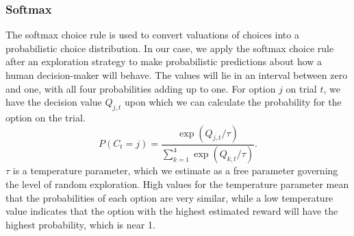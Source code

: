 \subsubsection{Softmax}
The softmax choice rule is used to convert valuations of choices into a probabilistic choice distribution. In our case, we apply the softmax choice rule after an exploration strategy to make probabilistic predictions about how a human decision-maker will behave. The values will lie in an interval between zero and one, with all four probabilities adding up to one. %
For option $j$ on trial $t$, we have the decision value $Q_{j,t}$ upon which we can calculate the probability for the option on the trial. 
\begin{equation}
P(C_{t}=j) = \frac{\exp(Q_{j,t}/\tau)}{\sum_{k=1}^4 \exp(Q_{k,t}/\tau)}.
\end{equation}
$\tau$ is a temperature parameter, which we estimate as a free parameter governing the level of random exploration. %
High values for the temperature parameter mean that the probabilities of each option are very similar, while a low temperature value indicates that the option with the highest estimated reward will have the highest probability, which is near 1. 

